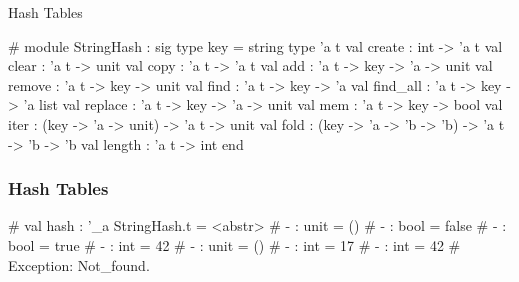 \documentclass{plt}
\begin{document}
\begin{frame}[fragile]{Hash Tables}

\begin{interactive}
# 
module StringHash :
  sig
    type key = string
    type 'a t
    val create : int -> 'a t
    val clear : 'a t -> unit
    val copy : 'a t -> 'a t
    val add : 'a t -> key -> 'a -> unit
    val remove : 'a t -> key -> unit
    val find : 'a t -> key -> 'a
    val find_all : 'a t -> key -> 'a list
    val replace : 'a t -> key -> 'a -> unit
    val mem : 'a t -> key -> bool
    val iter : (key -> 'a -> unit) -> 'a t -> unit
    val fold : (key -> 'a -> 'b -> 'b) -> 'a t -> 'b -> 'b
    val length : 'a t -> int
  end
\end{interactive}

\end{frame}

\begin{frame}[fragile]
  \frametitle{Hash Tables}

\begin{interactive}
# 
val hash : '_a StringHash.t = <abstr>
# 
- : unit = ()
# 
- : bool = false
# 
- : bool = true
# 
- : int = 42
# 
- : unit = ()
# 
- : int = 17
# 
- : int = 42
# 
Exception: Not_found.
\end{interactive}

\end{frame}
\end{document}

